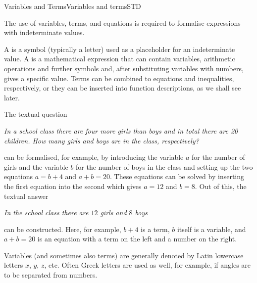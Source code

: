 \begin{MXContent}{Variables and Terms}{Variables and terms}{STD}

The use of variables, terms, and equations is required to formalise expressions with 
indeterminate values.

\begin{MInfo}
A  is a symbol (typically a letter) used as a placeholder for an
indeterminate value. A  is a mathematical expression that can contain variables, arithmetic 
operations and further symbols and, after substituting variables with numbers, gives a specific value. 
Terms can be combined to equations and inequalities, respectively, or they can be inserted into function
descriptions, as we shall see later.
\end{MInfo}


\begin{MExample}
The textual question 

\textit{In a school class there are four more girls than boys and in total there are 20 children. How many 
girls and boys are in the class, respectively?
}

can be formalised, for example, by introducing the variable $a$ for the number of girls and 
the variable $b$ for the number of boys in the class and setting up the two equations 
$a=b+4$ and $a+b=20$. These equations can be solved by inserting the first equation into 
the second which gives $a=12$ and $b=8$. Out of this, the textual answer 

\textit{In the school class there are $12$ girls and $8$ boys}

can be constructed. Here, for example, $b+4$ is a term, $b$ itself is a variable, and
$a+b=20$ is an equation with a term on the left and a number on the right.
\end{MExample}
Variables (and sometimes also terms) are generally denoted by Latin lowercase letters $x$, $y$, $z$, etc.
Often Greek letters are used as well, for example, if angles are to be separated from numbers.


\end{MXContent}
